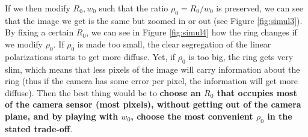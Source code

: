 \documentclass[11pt, a4paper, twoside]{article} %
\begin{document}
If we then modify $R_0,w_0$ such that the ratio $\rho_0=R_0/w_0$ is preserved, we can see that the image we get is the same but zoomed in or out (see Figure \ref{fig:simul3}). By fixing a certain $R_0$, we can see in Figure \ref{fig:simul4} how the ring changes if we modify $\rho_0$. If $\rho_0$ is made too small, the clear segregation of the linear polarizations starts to get more diffuse. Yet, if $\rho_0$ is too big, the ring gets very slim, which means that less pixels of the image will carry information about the ring (thus if the camera has some error per pixel, the information will get more diffuse). Then the best thing would be to {\bf choose an $R_0$ that occupies most of the camera sensor (most pixels), without getting out of the camera plane, and by playing with $w_0$, choose the most convenient $\rho_0$ in the stated trade-off}.
\end{document}

